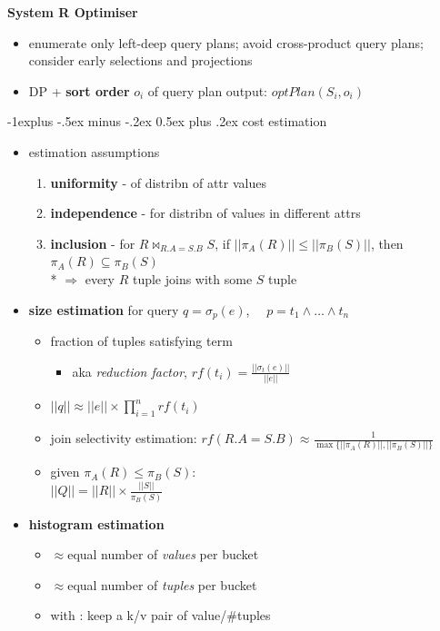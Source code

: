 \documentclass[10pt, landscape]{article}
\makeatletter
\renewcommand{\subsection}{\@startsection{subsection}{2}{0mm}%
  {-1explus -.5ex minus -.2ex}%
  {0.5ex plus .2ex}%
{\normalfont\normalsize\bfseries}}
\makeatother
\begin{document}
\begin{multicols*}{4}
  \textbf{System R Optimiser}
  \vspace*{-0.2cm}
  \begin{itemize}
    \item enumerate only left-deep query plans; avoid cross-product query plans; consider early selections and projections
    \item DP + \textbf{sort order} $o_i$ of query plan output: $optPlan(S_i, o_i)$
  \end{itemize}

  \vspace*{-0.6cm}
  \subsection{cost estimation}

  \begin{itemize}
    \item estimation assumptions
      \begin{enumerate}
        \item \textbf{uniformity} - of distribn of attr values
        \item \textbf{independence} - for distribn of values in different attrs
        \item \textbf{inclusion} - for $R \bowtie_{R.A=S.B}S$, if $||\pi_A(R)|| \leq ||\pi_B(S)||$, then $\pi_A(R) \subseteq \pi_B(S)$ 
          \\* $\Rightarrow$ every $R$ tuple joins with some $S$ tuple
      \end{enumerate}
    \item \textbf{size estimation} for query $q = \sigma_p(e)$,  $\quad p = t_1 \land \dots \land t_n$
      \begin{itemize}
        \item {} fraction of tuples satisfying term
          \begin{itemize}
            \item aka \textit{reduction factor}, $rf(t_i) = \frac{||\sigma_t(e)||}{||e||}$
          \end{itemize}
        \item $||q|| \approx ||e|| \times \prod^n_{i=1}rf(t_i)$
        \item join selectivity estimation: $rf(R.A=S.B) \approx \frac{1}{\max\{||\pi_A(R)||, ||\pi_B(S)||\}}$
        \item given $\pi_A(R) \leq \pi_B(S)$:\\$||Q|| = ||R|| \times\frac{||S||}{\pi_B(S)}$
      \end{itemize}
    \item \textbf{histogram estimation}
      \begin{itemize}
        \item {} $\approx$equal number of \textit{values} per bucket
        \item {} $\approx$equal number of \textit{tuples} per bucket
        \item with : keep a k/v pair of value/\#tuples
      \end{itemize}
  \end{itemize}


\end{multicols*}
\end{document}
